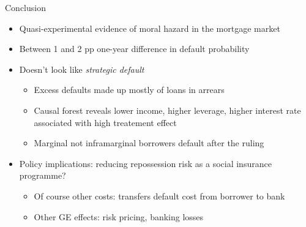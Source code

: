 \documentclass[ignorenonframetext,aspectratio=169]{beamer}
\providecommand{\tightlist}{%
  \setlength{\itemsep}{0pt}\setlength{\parskip}{0pt}}
\begin{document}
\begin{frame}{Conclusion}

\begin{itemize}
\item
  Quasi-experimental evidence of moral hazard in the mortgage market
\item
  Between 1 and 2 pp one-year difference in default probability
\item
  Doesn't look like \emph{strategic default}

  \begin{itemize}
  \tightlist
  \item
    Excess defaults made up mostly of loans in arrears
  \item
    Causal forest reveals lower income, higher leverage, higher interest
    rate associated with high treatement effect
  \item
    Marginal not inframarginal borrowers default after the ruling
  \end{itemize}
\item
  Policy implications: reducing repossession risk as a social insurance
  programme?

  \begin{itemize}
  \tightlist
  \item
    Of course other costs: transfers default cost from borrower to bank
  \item
    Other GE effects: risk pricing, banking losses
  \end{itemize}
\end{itemize}

\end{frame}
\end{document}
